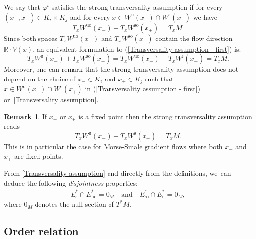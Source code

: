 \documentclass[11pt]{article}
\newcommand{\rs}{\mathrm{s}}
\newcommand{\rso}{\mathrm{so}}
\newcommand{\ru}{\mathrm{u}}
\newcommand{\ruo}{\mathrm{uo}}
\theoremstyle{definition}
\newtheorem{remark}[definition]{Remark}
\theoremstyle{plain}
\newcommand{\R}{\mathbb{R}}
\begin{document}
We say that $\varphi^t$ satisfies the strong transversality assumption if for every $(x_-,x_+) \in K_i \times K_j$ and for every $x \in W^\ru (x_-) \cap W^\rs (x_+)$ we have
\begin{equation}\label{Transversality assumption - first}
T_x W^{\ruo} (x_-) + T_x W^{\rso} (x_+) = T_x M.
\end{equation}
Since both spaces $T_x W^{\ruo} (x_-) $ and $T_x W^{\rso} (x_+)$ contain the flow direction $\R\cdot V(x)$, an equivalent formulation to (\ref{Transversality assumption - first}) is:
\begin{equation}\label{Transversality assumption}
T_x W^{\ru} (x_-) + T_x W^{\rso} (x_+) = T_x W^{\ruo} (x_-) + T_x W^{\rs} (x_+) = T_x M.
\end{equation}
Moreover, one can remark that the strong transversality assumption does not depend on the choice of $x_- \in K_i$ and $x_+ \in K_j$ such that $x \in W^\ru (x_-) \cap W^\rs (x_+)$ in (\ref{Transversality assumption - first}) or~\eqref{Transversality assumption}.
\begin{remark}If $x_-$ or $x_+$ is a fixed point then the strong transversality assumption reads
\[
T_x W^{\ru} (x_-) + T_x W^{\rs} (x_+) = T_x M.
\]
This is in particular the case for Morse-Smale gradient flows \cite{DR0} where both $x_-$ and~$x_+$ are fixed points.
\end{remark}

From \eqref{Transversality assumption} and directly from the definitions, we~can deduce the following \textit{disjointness} properties:
\begin{align*}
E_\rs^* \cap E_{\ruo}^* = 0_M \quad\text{and}\quad E_{\rso}^* \cap E_\ru^* = 0_M,
\end{align*}
where $0_M$ denotes the null section of $T^*M$.

\subsection{Order relation}
\end{document}
